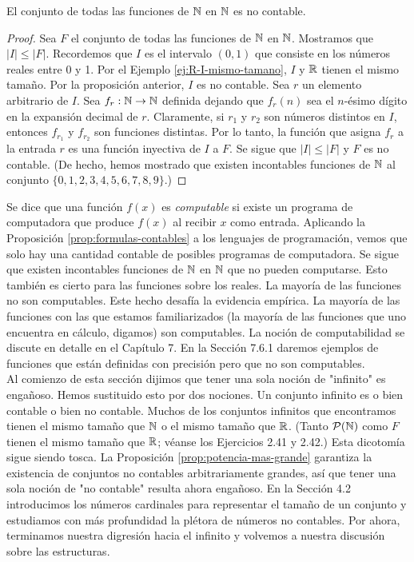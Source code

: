 \documentclass[12pt,a4paper]{book}
\newcommand{\comillas}[1]{"#1"}
\begin{document}
    \begin{proposicion}\label{prop:funciones-no-contables}
        El conjunto de todas las funciones de $\mathbb{N}$ en $\mathbb{N}$ es no contable.
    \end{proposicion}
    \begin{proof}
        Sea $F$ el conjunto de todas las funciones de $\mathbb{N}$ en $\mathbb{N}$. Mostramos que $|I|\leq|F|$. Recordemos que $I$ es el
        intervalo $(0,1)$ que consiste en los números reales entre 0 y 1. Por el Ejemplo \ref{ej:R-I-mismo-tamano}, $I$ y
        $\mathbb{R}$ tienen el mismo tamaño. Por la proposición anterior, $I$ es no contable. Sea $r$ un elemento arbitrario de $I$.
        Sea $f_{r}:\mathbb{N}\rightarrow\mathbb{N}$ definida dejando que $f_{r}(n)$ sea el $n$-ésimo dígito en la expansión decimal de $r$.
        Claramente, si $r_{1}$ y $r_{2}$ son números distintos en $I$, entonces $f_{r_{1}}$ y $f_{r_{2}}$ son funciones
        distintas. Por lo tanto, la función que asigna $f_{r}$ a la entrada $r$ es una función inyectiva de $I$ a $F$. Se
        sigue que $|I|\leq|F|$ y $F$ es no contable. (De hecho, hemos mostrado que existen incontables funciones de
        $\mathbb{N}$ al conjunto $\{0,1,2,3,4,5,6,7,8,9\}$.)
    \end{proof}

    Se dice que una función $f(x)$ es \textit{computable} si existe un programa de computadora que produce $f(x)$ al
    recibir $x$ como entrada. Aplicando la Proposición \ref{prop:formulas-contables} a los lenguajes de programación, vemos
    que solo hay una cantidad contable de posibles programas de computadora. Se sigue que existen incontables funciones de
    $\mathbb{N}$ en $\mathbb{N}$ que no pueden computarse. Esto también es cierto para las funciones sobre los reales. La mayoría de las
    funciones no son computables. Este hecho desafía la evidencia empírica. La mayoría de las funciones con las que estamos
    familiarizados (la mayoría de las funciones que uno encuentra en cálculo, digamos) son computables. La noción de
    computabilidad se discute en detalle en el Capítulo 7. En la Sección 7.6.1 daremos ejemplos de funciones que están
    definidas con precisión pero que no son computables.\\
    Al comienzo de esta sección dijimos que tener una sola noción de \comillas{infinito} es engañoso. Hemos sustituido
    esto por dos nociones. Un conjunto infinito es o bien contable o bien no contable. Muchos de los conjuntos infinitos que
    encontramos tienen el mismo tamaño que $\mathbb{N}$ o el mismo tamaño que $\mathbb{R}$. (Tanto $\mathcal{P}(\mathbb{N})$ como $F$ tienen el mismo
    tamaño que $\mathbb{R}$; véanse los Ejercicios 2.41 y 2.42.) Esta dicotomía sigue siendo tosca. La Proposición
    \ref{prop:potencia-mas-grande} garantiza la existencia de conjuntos no contables arbitrariamente grandes, así que
    tener una sola noción de \comillas{no contable} resulta ahora engañoso. En la Sección 4.2 introducimos los números
    cardinales para representar el tamaño de un conjunto y estudiamos con más profundidad la plétora de números no
    contables. Por ahora, terminamos nuestra digresión hacia el infinito y volvemos a nuestra discusión sobre las
    estructuras.
\end{document}
